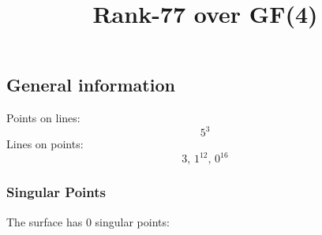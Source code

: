 \documentclass{article}
\newcommand\setTBstruts{\def\T{\rule{0pt}{2.6ex}}%
\def\B{\rule[-1.2ex]{0pt}{0pt}}}
\begin{document}
 
\setTBstruts



{\allowdisplaybreaks%






\title{Rank-77 over GF(4)}
\author{}%
\maketitle%
%
{}



\subsection*{General information}
Points on lines:
$$
5^3$$
Lines on points:
$$
3,\,1^{12},\,0^{16}$$
\subsubsection*{Singular Points}
The surface has 0 singular points:\\
\begin{align*}
\end{align*}
}
\end{document}
